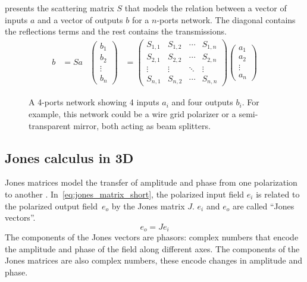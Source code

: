  presents the scattering matrix $S$ that models the relation between a vector of inputs $a$ and a vector of outputs $b$ for a $n$-ports network.
The diagonal contains the reflections terms and the rest contains the transmissions.
\begin{align}
    b &= S a
    &
    \begin{pmatrix}
        b_1\\
        b_2\\
        \vdots\\
        b_n
    \end{pmatrix}
    &=
    \begin{pmatrix}
        S_{1, 1} & S_{1, 2} & \cdots & S_{1, n} \\
        S_{2, 1} & S_{2, 2} & \cdots & S_{2, n} \\
        \vdots   & \vdots   & \ddots & \vdots   \\
        S_{n, 1} & S_{n, 2} & \cdots & S_{n, n}
    \end{pmatrix}
    \begin{pmatrix}
        a_1\\
        a_2\\
        \vdots\\
        a_n
    \end{pmatrix}
    \label{eq:scattering_matrix}
\end{align}

\begin{figure}[hbtp]
    \centering
    
    \caption{A 4-ports network showing 4 inputs $a_i$ and four outputs $b_i$.  For example, this network could be a wire grid polarizer or a semi-transparent mirror, both acting as beam splitters.}%
    \label{fig:scattering_matrix_notations}
\end{figure}


\subsection{Jones calculus in 3D}

Jones matrices model the transfer of amplitude and phase from one polarization to another \cite{hecht2002optics}.
In~\cref{eq:jones_matrix_short}, the polarized input field $e_i$ is related to the polarized output field~$e_o$ by the Jones matrix $J$.
$e_i$ and $e_o$ are called ``Jones vectors''.
\begin{equation}
    e_o = J e_i
    \label{eq:jones_matrix_short}
\end{equation}
The components of the Jones vectors are phasors: complex numbers that encode the amplitude and phase of the field along different axes.
The components of the Jones matrices are also complex numbers, these encode changes in amplitude and phase.

